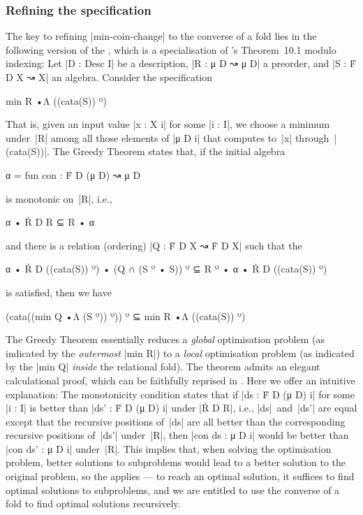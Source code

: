 \subsubsection{Refining the specification}

The key to refining |min-coin-change| to the converse of a fold lies in the following version of the , which is a specialisation of \citeauthor{Bird-AoP}'s Theorem~10.1 modulo indexing:
Let |D : Desc I| be a description, |R : μ D ↝ μ D| a preorder, and |S : Ḟ D X ↝ X| an algebra.
Consider the specification
\begin{code}
min R •Λ ((cata(S)) º)
\end{code}
That is, given an input value |x : X i| for some |i : I|, we choose a minimum under~|R| among all those elements of |μ D i| that computes to~|x| through~|(cata(S))|.
The Greedy Theorem states that, if the initial algebra
\begin{code}
α = fun con : Ḟ D (μ D) ↝ μ D
\end{code}
is monotonic on~|R|, i.e.,
\begin{code}
α • Ṙ D R ⊆ R • α
\end{code}
and there is a relation (ordering) |Q : Ḟ D X ↝ Ḟ D X| such that the 
\begin{code}
α • Ṙ D ((cata(S)) º) • (Q ∩ (S º • S)) º ⊆ R º • α • Ṙ D ((cata(S)) º)
\end{code}
is satisfied, then we have
\begin{code}
(cata((min Q •Λ (S º)) º)) º ⊆ min R •Λ ((cata(S)) º)
\end{code}
The Greedy Theorem essentially reduces a \emph{global} optimisation problem (as indicated by the \emph{outermost} |min R|) to a \emph{local} optimisation problem (as indicated by the |min Q| \emph{inside} the relational fold).
The theorem admits an elegant calculational proof, which can be faithfully reprised in \Agda.
Here we offer an intuitive explanation:
The monotonicity condition states that if |ds : Ḟ D (μ D) i| for some |i : I| is better than |ds' : Ḟ D (μ D) i| under |Ṙ D R|, i.e., |ds|~and~|ds'| are equal except that the recursive positions of~|ds| are all better than the corresponding recursive positions of~|ds'| under~|R|, then |con ds : μ D i| would be better than |con ds' : μ D i| under~|R|.
This implies that, when solving the optimisation problem, better solutions to subproblems would lead to a better solution to the original problem, so the  applies --- to reach an optimal solution, it suffices to find optimal solutions to subproblems, and we are entitled to use the converse of a fold to find optimal solutions recursively.
